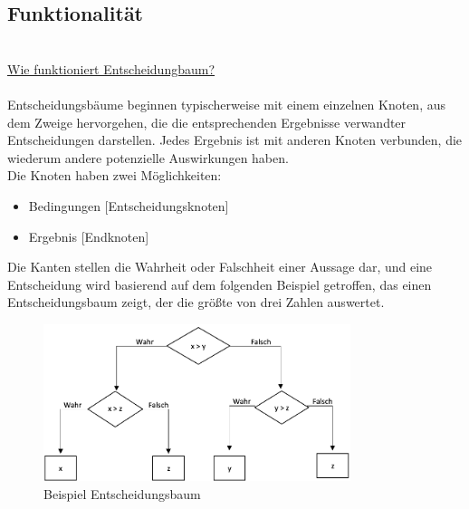 \documentclass[12pt]{article}
\begin{document}
\begin{text}
\subsection{Funktionalität}\\
    \underline{Wie funktioniert Entscheidungbaum?}\\\\
Entscheidungsbäume beginnen typischerweise mit einem einzelnen Knoten, aus dem Zweige hervorgehen, die die entsprechenden Ergebnisse verwandter Entscheidungen darstellen. Jedes Ergebnis ist mit anderen Knoten verbunden, die wiederum andere potenzielle Auswirkungen haben.  \\
Die Knoten haben zwei Möglichkeiten:
\begin{itemize}
    \item Bedingungen [Entscheidungsknoten]
    \item Ergebnis [Endknoten]
\end{itemize}
Die Kanten stellen die Wahrheit oder Falschheit einer Aussage dar, und eine Entscheidung wird basierend auf dem folgenden Beispiel getroffen, das einen Entscheidungsbaum zeigt, der die größte von drei Zahlen auswertet.
\begin{figure}[h]
\begin{center}
 \includegraphics[width=0.8\textwidth]{entscheidungsbaum .png}
 \caption{Beispiel Entscheidungsbaum}
\end{center}
\end{figure}
\\\\

\end{text}
\end{document}
